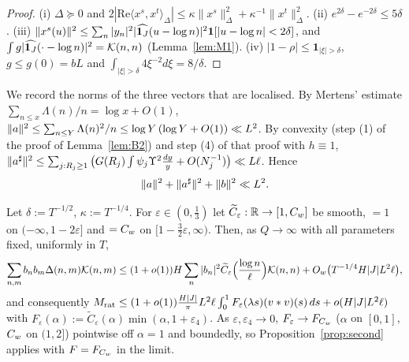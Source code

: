 \begin{proof}
(i) $\Delta\succeq0$ and $2|\mathrm{Re}\langle x^s,x^t\rangle_\Delta|\le\kappa\|x^s\|_\Delta^2+\kappa^{-1}\|x^t\|_\Delta^2$. (ii) $e^{2\delta}-e^{-2\delta}\le5\delta$.
(iii) $\|x^s(u)\|^2\le\sum_n|y_n|^2|\widehat{\mathbf 1_J}(u-\log n)|^2\mathbf 1[|u-\log n|<2\delta]$, and $\int g|\widehat{\mathbf 1_J}(\cdot-\log n)|^2=\mathcal{K}(n,n)$ (Lemma~\ref{lem:M1}).
(iv) $|1-\rho|\le\mathbf 1_{|\xi|>\delta}$, $g\le g(0)=bL$ and $\int_{|\xi|>\delta}4\xi^{-2}d\xi=8/\delta$.
\end{proof}

We record the norms of the three vectors that are localised. By Mertens' estimate $\sum_{n\le x}\Lambda(n)/n=\log x+O(1)$,
$\|a\|^2\le\sum_{n\le Y}\Lambda(n)^2/n\le\log Y\,(\log Y+O(1))\ll L^2$. By convexity (step (1) of the proof of Lemma~\ref{lem:B2}) and step (4) of
that proof with $h\equiv1$, $\|a^\sharp\|^2\le\sum_{j:R_j\ge1}\big(G(R_j)\int\psi_j\Upsilon^2\frac{dy}y+O(N_j^{-1})\big)\ll L\ell$. Hence
\begin{equation}\label{eqB:norms}
 \|a\|^2+\|a^\sharp\|^2+\|b\|^2\ll L^2 .
\end{equation}

\begin{proposition}\label{prop:TI}
Let $\delta:=T^{-1/2}$, $\kappa:=T^{-1/4}$. For $\varepsilon\in(0,\frac13)$ let $\widetilde C_\varepsilon:\mathbb R\to[1,C_w]$ be smooth, $=1$ on
$(-\infty,1-2\varepsilon]$ and $=C_w$ on $[1-\frac32\varepsilon,\infty)$. Then, as $Q\to\infty$ with all parameters fixed, uniformly in $T$,
\[
 \sum_{n,m}b_nb_m\Delta(n,m)\mathcal{K}(n,m)\le(1+o(1))H\sum_n|b_n|^2\widetilde C_\varepsilon\Big(\frac{\log n}\ell\Big)\mathcal{K}(n,n)+O_w\big(T^{-1/4}H|J|L^2\ell\big),
\]
and consequently
$M_{\rm rat}\le(1+o(1))\frac{H|J|}{\pi}L^2\ell\int_0^1F_\varepsilon(\lambda s)(v*v)(s)\,ds+o(H|J|L^2\ell)$ with
$F_\varepsilon(\alpha):=\widetilde C_\varepsilon(\alpha)\min(\alpha,1+\varepsilon_4)$. As $\varepsilon,\varepsilon_4\to0$, $F_\varepsilon\to F_{C_w}$ ($\alpha$ on $[0,1]$, $C_w$ on
$(1,2]$) pointwise off $\alpha=1$ and boundedly, so Proposition~\ref{prop:second} applies with $F=F_{C_w}$ in the limit.
\end{proposition}

